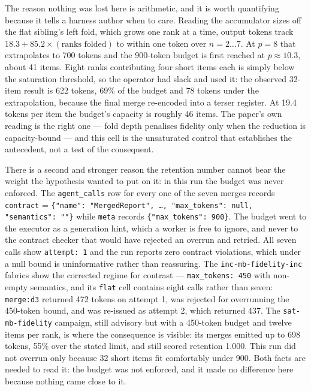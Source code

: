 \documentclass[11pt]{article}
\begin{document}
The reason nothing was lost here is arithmetic, and it is worth quantifying because it
tells a harness author when to care. Reading the accumulator sizes off the flat
sibling's left fold, which grows one rank at a time, output tokens track
$18.3 + 85.2 \times (\text{ranks folded})$ to within one token over $n = 2 \dots 7$. At
$p = 8$ that extrapolates to 700 tokens and the 900-token budget is first reached at
$p \approx 10.3$, about 41 items. Eight ranks contributing four short items each is
simply below the saturation threshold, so the operator had slack and used it: the
observed 32-item result is 622 tokens, 69\% of the budget and 78 tokens under the
extrapolation, because the final merge re-encoded into a terser register. At 19.4
tokens per item the budget's capacity is roughly 46 items. The paper's own reading is
the right one --- fold depth penalises fidelity only when the reduction is
capacity-bound --- and this cell is the unsaturated control that establishes the
antecedent, not a test of the consequent.

There is a second and stronger reason the retention number cannot bear the weight the
hypothesis wanted to put on it: in this run the budget was never enforced. The
\texttt{agent\_calls} row for every one of the seven merges records
\texttt{contract} = \texttt{\{"name": "MergedReport", \dots, "max\_tokens": null,
"semantics": ""\}} while \texttt{meta} records \texttt{\{"max\_tokens": 900\}}. The
budget went to the executor as a generation hint, which a worker is free to ignore, and
never to the contract checker that would have rejected an overrun and retried. All
seven calls show \texttt{attempt: 1} and the run reports zero contract violations,
which under a null bound is uninformative rather than reassuring. The
\texttt{inc-mb-fidelity-inc} fabrics show the corrected regime for contrast --- 
\texttt{max\_tokens: 450} with non-empty semantics, and its \texttt{flat} cell contains
eight calls rather than seven: \texttt{merge:d3} returned 472 tokens on attempt 1, was
rejected for overrunning the 450-token bound, and was re-issued as attempt 2, which
returned 437. The \texttt{sat-mb-fidelity} campaign, still advisory but
with a 450-token budget and twelve items per rank, is where the consequence is visible:
its merges emitted up to 698 tokens, 55\% over the stated limit, and still scored
retention 1.000. This run did not overrun only because 32 short items fit comfortably
under 900. Both facts are needed to read it: the budget was not enforced, and it made no
difference here because nothing came close to it.
\end{document}
